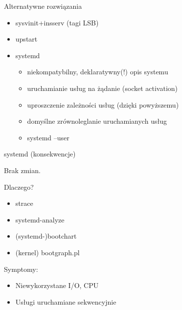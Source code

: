 \documentclass[presentation,aspectratio=43,12pt]{beamer}
\begin{document}
\begin{frame}[label=sec-6-3]{Alternatywne rozwiązania}
\begin{itemize}
\item sysvinit+insserv (tagi LSB)
\item upstart
\item systemd
\begin{itemize}
\item <2-> niekompatybilny, deklaratywny(!) opis systemu
\item <2-> uruchamianie usług na żądanie (socket activation)
\item <2-> uproszczenie zależności usług (dzięki powyższemu)
\item <2-> domyślne zrównoleglanie uruchamianych usług
\item <2-> systemd --user
\end{itemize}
\end{itemize}

\end{frame}
\begin{frame}[label=sec-6-4]{systemd (konsekwencje)}
\pause

Brak zmian.

\pause\vskip1cm

Dlaczego?
\begin{itemize}
\item <2-> strace
\item <2-> systemd-analyze
\item <2-> (systemd-)bootchart
\item <2-> (kernel) bootgraph.pl
\end{itemize}

Symptomy:
\begin{itemize}
\item <3-> Niewykorzystane I/O, CPU
\item <3-> Usługi uruchamiane sekwencyjnie
\end{itemize}


\end{frame}
\end{document}
